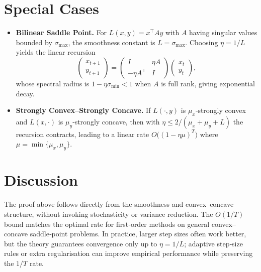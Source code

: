 \documentclass{article}
\begin{document}
\section*{Special Cases}
\begin{itemize}[leftmargin=*]
\item \textbf{Bilinear Saddle Point.} For $L(x,y)=x^\top Ay$ with $A$ having singular values bounded by $\sigma_{\max}$, the smoothness constant is $L=\sigma_{\max}$. Choosing $\eta=1/L$ yields the linear recursion
\[
\begin{pmatrix}x_{t+1}\\ y_{t+1}\end{pmatrix}
= \begin{pmatrix}I & \eta A\\ -\eta A^\top & I\end{pmatrix}
\begin{pmatrix}x_{t}\\ y_{t}\end{pmatrix},
\]
whose spectral radius is $1-\eta\sigma_{\min} <1$ when $A$ is full rank, giving exponential decay.
\item \textbf{Strongly Convex–Strongly Concave.} If $L(\cdot,y)$ is $\mu_x$‑strongly convex and $L(x,\cdot)$ is $\mu_y$‑strongly concave, then with $\eta\le 2/(\mu_x+\mu_y+L)$ the recursion contracts, leading to a linear rate $O\big((1-\eta\mu)^T\big)$ where $\mu=\min\{\mu_x,\mu_y\}$.
\end{itemize}

\section*{Discussion}
The proof above follows directly from the smoothness and convex–concave structure, without invoking stochasticity or variance reduction. The $O(1/T)$ bound matches the optimal rate for first‑order methods on general convex–concave saddle‑point problems. In practice, larger step sizes often work better, but the theory guarantees convergence only up to $\eta=1/L$; adaptive step‑size rules or extra regularisation can improve empirical performance while preserving the $1/T$ rate.
\end{document}
